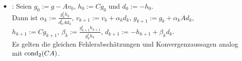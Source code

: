 \begin{Bem}
\begin{itemize}
\begin{itemize}
            \item
            :
            Seien $g_0 := g - Av_0$, $h_0 := Cg_0$ und $d_0 := -h_0$.\\
            Dann ist
            $\alpha_k := \frac{g_k^t h_k}{d_k^t A d_k}$,\qquad
            $v_{k+1} := v_k + \alpha_k d_k$,\qquad
            $g_{k+1} := g_k + \alpha_k A d_k$,\\
            $h_{k+1} := Cg_{k+1}$,\qquad
            $\beta_k := \frac{g_{k+1}^t h_{k+1}}{g_k^t h_k}$,\qquad
            $d_{k+1} := -h_{k+1} + \beta_k d_k$.\\
            Es gelten die gleichen Fehlerabschätzungen und
            Konvergenzaussagen analog mit $\operatorname{cond}_2(CA)$.
        \end{itemize}
    \end{itemize}
\end{Bem}

\linie
\pagebreak

